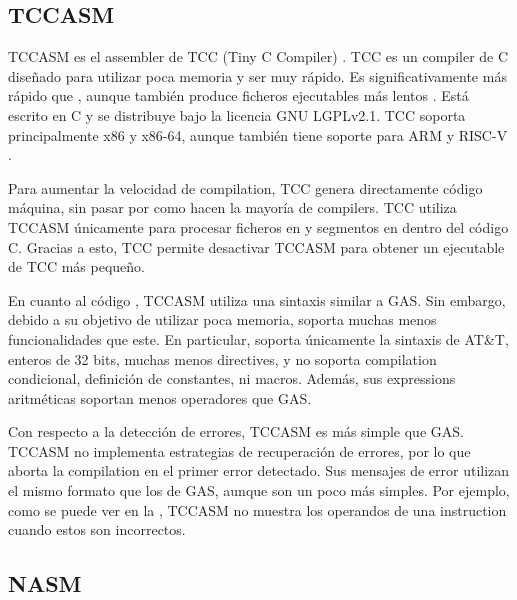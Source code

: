 \subsection{TCCASM}

TCCASM es el \gls{assembler} de TCC (Tiny C Compiler) \parencite{tcc}. TCC es un
\gls{compiler} de C diseñado para utilizar poca memoria y ser muy rápido. Es
significativamente más rápido  que
, aunque también produce ficheros ejecutables más lentos
\parencite{tcc-speed}. Está escrito en C y se distribuye bajo la licencia GNU
LGPLv2.1. TCC soporta principalmente x86 y x86-64, aunque también tiene soporte para
ARM y RISC-V \parencite{tcc-manual} \parencite{tcc-arm} \parencite{tcc-riscv}.

Para aumentar la velocidad de \gls{compilation}, TCC genera directamente código
máquina, sin pasar por  como hacen la mayoría de
\glspl{compiler}. TCC utiliza TCCASM únicamente para procesar ficheros en
 y segmentos en 
dentro del código C. Gracias a esto, TCC permite desactivar TCCASM para obtener
un ejecutable de TCC más pequeño. \parencite{tcc-manual}

En cuanto al código , TCCASM utiliza una sintaxis
similar a \gls{GAS}. Sin embargo, debido a su objetivo de utilizar poca memoria,
soporta muchas menos funcionalidades que este. En particular, soporta únicamente
la sintaxis de AT\&T, enteros de 32 bits, muchas menos \glspl{directive}, y no
soporta \gls{compilation} condicional, definición de constantes, ni
\glspl{macro}. Además, sus \glspl{expression} aritméticas soportan menos
operadores que \gls{GAS}.

Con respecto a la detección de errores, TCCASM es más simple que \gls{GAS}.
TCCASM no implementa estrategias de recuperación de errores, por lo que aborta
la \gls{compilation} en el primer error detectado. Sus mensajes de error
utilizan el mismo formato que los de \gls{GAS}, aunque son un poco más simples.
Por ejemplo, como se puede ver en la , TCCASM no muestra
los operandos de una \gls{instruction} cuando estos son incorrectos.


\subsection{NASM}

